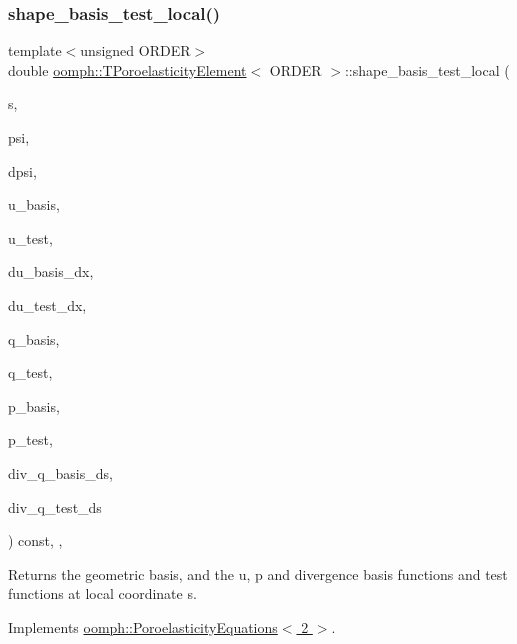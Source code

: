 \subsubsection{\texorpdfstring{shape\+\_\+basis\+\_\+test\+\_\+local()}{shape\_basis\_test\_local()}}
{\footnotesize\ttfamily template$<$unsigned O\+R\+D\+ER$>$ \\
double \hyperlink{classoomph_1_1TPoroelasticityElement}{oomph\+::\+T\+Poroelasticity\+Element}$<$ O\+R\+D\+ER $>$\+::shape\+\_\+basis\+\_\+test\+\_\+local (\begin{DoxyParamCaption}\item[{const \hyperlink{classoomph_1_1Vector}{Vector}$<$ double $>$ \&}]{s,  }\item[{\hyperlink{classoomph_1_1Shape}{Shape} \&}]{psi,  }\item[{\hyperlink{classoomph_1_1DShape}{D\+Shape} \&}]{dpsi,  }\item[{\hyperlink{classoomph_1_1Shape}{Shape} \&}]{u\+\_\+basis,  }\item[{\hyperlink{classoomph_1_1Shape}{Shape} \&}]{u\+\_\+test,  }\item[{\hyperlink{classoomph_1_1DShape}{D\+Shape} \&}]{du\+\_\+basis\+\_\+dx,  }\item[{\hyperlink{classoomph_1_1DShape}{D\+Shape} \&}]{du\+\_\+test\+\_\+dx,  }\item[{\hyperlink{classoomph_1_1Shape}{Shape} \&}]{q\+\_\+basis,  }\item[{\hyperlink{classoomph_1_1Shape}{Shape} \&}]{q\+\_\+test,  }\item[{\hyperlink{classoomph_1_1Shape}{Shape} \&}]{p\+\_\+basis,  }\item[{\hyperlink{classoomph_1_1Shape}{Shape} \&}]{p\+\_\+test,  }\item[{\hyperlink{classoomph_1_1Shape}{Shape} \&}]{div\+\_\+q\+\_\+basis\+\_\+ds,  }\item[{\hyperlink{classoomph_1_1Shape}{Shape} \&}]{div\+\_\+q\+\_\+test\+\_\+ds }\end{DoxyParamCaption}) const\hspace{0.3cm}{\ttfamily [inline]}, {\ttfamily [protected]}, {\ttfamily [virtual]}}



Returns the geometric basis, and the u, p and divergence basis functions and test functions at local coordinate s. 



Implements \hyperlink{classoomph_1_1PoroelasticityEquations_a14fa3f0b43c4d7da65504702aef760bf}{oomph\+::\+Poroelasticity\+Equations$<$ 2 $>$}.



